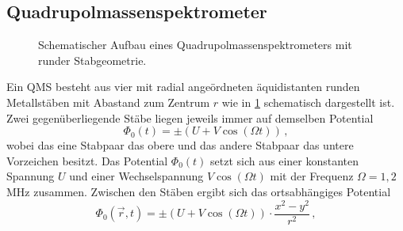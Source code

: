 \subsection{Quadrupolmassenspektrometer}\label{subsec:quadrupolmassenspektrometer}
\begin{figure}[h]
 	\centering
	\caption[Quadrupolmassenspektrometer,
	schematisch]{Schematischer Aufbau eines
	Quadrupolmassenspektrometers mit runder
	Stabgeometrie.}\label{fig:quadrupolmassenspektrometer}
\end{figure}
Ein QMS besteht aus vier mit radial angeördneten äquidistanten runden
Metallstäben mit Abastand zum Zentrum $r$ wie in
\ref{fig:quadrupolmassenspektrometer} schematisch dargestellt ist. Zwei gegenüberliegende Stäbe liegen jeweils immer auf demselben Potential
\begin{equation}\label{eq:qms_potential_0}
	\Phi_0(t)=\pm\left(U+V\cos{(\Omega t)}\right)\,,
\end{equation}
wobei das eine Stabpaar das obere und das andere Stabpaar das untere Vorzeichen
besitzt. Das Potential $\Phi_0(t)$ setzt sich aus einer konstanten Spannung $U$
und einer Wechselspannung $V\cos{(\Omega t)}$ mit der Frequenz $\Omega=1,2\,$MHz
zusammen. Zwischen den Stäben ergibt sich das ortsabhängiges Potential
\begin{equation}\label{eq:qms_potential_ort}
	\Phi_0(\vec{r},t)=\pm\left(U+V\cos{(\Omega
	t)}\right)\cdot\frac{x^2-y^2}{r^2}\,,
\end{equation}
